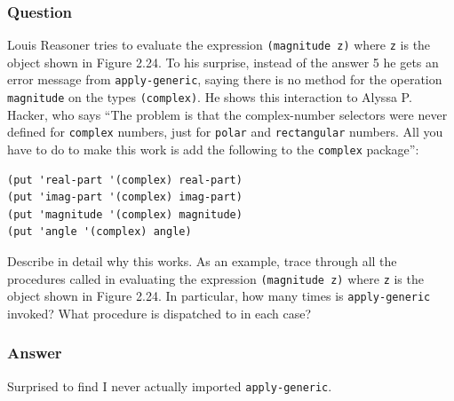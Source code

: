\documentclass[final,fleqn,titlepage,twoside]{article}
\begin{document}
\subsubsection{Question}
\label{sec:org80e628a}
Louis Reasoner tries to evaluate the expression \texttt{(magnitude z)} where
\texttt{z} is the object shown in Figure 2.24. To his surprise, instead of
the answer 5 he gets an error message from \texttt{apply-generic}, saying
there is no method for the operation \texttt{magnitude} on the types
\texttt{(complex)}. He shows this interaction to Alyssa P. Hacker, who says
``The problem is that the complex-number selectors were never defined for
\texttt{complex} numbers, just for \texttt{polar} and
\texttt{rectangular} numbers. All you have to do to make this work is add the
following to the \texttt{complex} package'':

\begin{verbatim}
(put 'real-part '(complex) real-part)
(put 'imag-part '(complex) imag-part)
(put 'magnitude '(complex) magnitude)
(put 'angle '(complex) angle)
\end{verbatim}

Describe in detail why this works. As an example, trace through all the
procedures called in evaluating the expression \texttt{(magnitude z)} where
\texttt{z} is the object shown in Figure 2.24. In particular, how many times
is \texttt{apply-generic} invoked? What procedure is dispatched to in each
case?

\subsubsection{Answer}
\label{sec:orgec6408a}
Surprised to find I never actually imported \texttt{apply-generic}.
\end{document}
